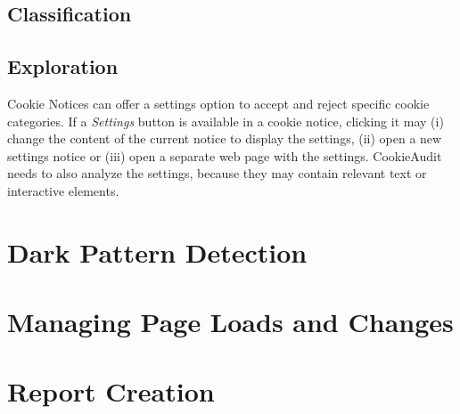 \subsection{Classification}


\subsection{Exploration}
Cookie Notices can offer a settings option to accept and reject specific cookie categories.
If a \emph{Settings} button is available in a cookie notice, clicking it may (i) change the content of the current notice to display the settings, (ii) open a new settings notice or (iii) open a separate web page with the settings.
CookieAudit needs to also analyze the settings, because they may contain relevant text or interactive elements. 

\section{Dark Pattern Detection}
\section{Managing Page Loads and Changes}
\section{Report Creation}